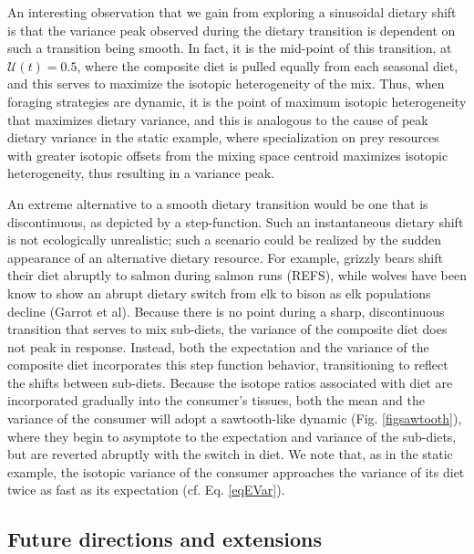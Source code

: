 \documentclass{frontiersSCNS}
\begin{document}
An interesting observation that we gain from exploring a sinusoidal dietary shift is that the variance peak observed during the dietary transition is dependent on such a transition being smooth.
In fact, it is the mid-point of this transition, at $\mathcal{U}(t) = 0.5$, where the composite diet is pulled equally from each seasonal diet, and this serves to maximize the isotopic heterogeneity of the mix.
Thus, when foraging strategies are dynamic, it is the point of maximum isotopic heterogeneity that maximizes dietary variance, and this is analogous to the cause of peak dietary variance in the static example, where specialization on prey resources with greater isotopic offsets from the mixing space centroid maximizes isotopic heterogeneity, thus resulting in a variance peak. 

An extreme alternative to a smooth dietary transition would be one that is discontinuous, as depicted by a step-function.
Such an instantaneous dietary shift is not ecologically unrealistic; such a scenario could be realized by the sudden appearance of an alternative dietary resource.
For example, grizzly bears shift their diet abruptly to salmon during salmon runs (REFS), while wolves have been know to show an abrupt dietary switch from elk to bison as elk populations decline (Garrot et al).
Because there is no point during a sharp, discontinuous transition that serves to mix sub-diets, the variance of the composite diet does not peak in response.
Instead, both the expectation and the variance of the composite diet incorporates this step function behavior, transitioning to reflect the shifts between sub-diets.
Because the isotope ratios associated with diet are incorporated gradually into the consumer's tissues, both the mean and the variance of the consumer will adopt a sawtooth-like dynamic (Fig. \ref{figsawtooth}), where they begin to asymptote to the expectation and variance of the sub-diets, but are reverted abruptly with the switch in diet.
We note that, as in the static example, the isotopic variance of the consumer approaches the variance of its diet twice as fast as its expectation (cf. Eq. \ref{eqEVar}).

\subsection*{Future directions and extensions}

\end{document}
